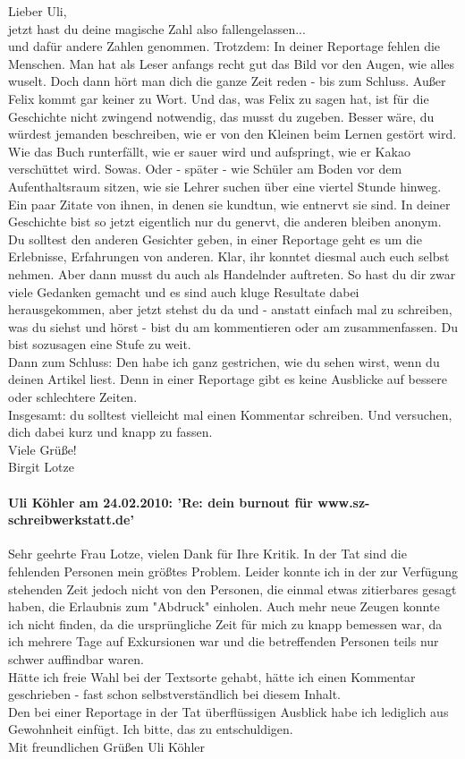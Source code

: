 \documentclass[a4paper,12pt,twoside]{scrbook}
\begin{document}
Lieber Uli,
\\
jetzt hast du deine magische Zahl also fallengelassen...
\\
und dafür andere Zahlen genommen. Trotzdem: In deiner Reportage fehlen die Menschen. Man hat als Leser anfangs recht gut das Bild vor den Augen, wie alles wuselt. Doch dann hört man dich die ganze Zeit reden - bis zum Schluss. Außer Felix kommt gar keiner zu Wort. Und das, was Felix zu sagen hat, ist für die Geschichte nicht zwingend notwendig, das musst du zugeben. Besser wäre, du würdest jemanden beschreiben, wie er von den Kleinen beim Lernen gestört wird. Wie das Buch runterfällt, wie er sauer wird und aufspringt, wie er Kakao verschüttet wird. Sowas. Oder - später - wie Schüler am Boden vor dem Aufenthaltsraum sitzen, wie sie Lehrer suchen über eine viertel Stunde hinweg. Ein paar Zitate von ihnen, in denen sie kundtun, wie entnervt sie sind.
In deiner Geschichte bist so jetzt eigentlich nur du genervt, die anderen bleiben anonym. Du solltest den anderen Gesichter geben, in einer Reportage geht es um die Erlebnisse, Erfahrungen von anderen. Klar, ihr konntet diesmal auch euch selbst nehmen. Aber dann musst du auch als Handelnder auftreten. So hast du dir zwar viele Gedanken gemacht und es sind auch kluge Resultate dabei herausgekommen, aber jetzt stehst du da und - anstatt einfach mal zu schreiben, was du siehst und hörst - bist du am kommentieren oder am zusammenfassen. Du bist sozusagen eine Stufe zu weit.
\\
Dann zum Schluss: Den habe ich ganz gestrichen, wie du sehen wirst, wenn du deinen Artikel liest. Denn in einer Reportage gibt es keine Ausblicke auf bessere oder schlechtere Zeiten.
\\
Insgesamt: du solltest vielleicht mal einen Kommentar schreiben. Und versuchen, dich dabei kurz und knapp zu fassen.
\\
Viele Grüße!
\\
Birgit Lotze
\paragraph{Uli Köhler am 24.02.2010: 'Re: dein burnout für www.sz-schreibwerkstatt.de'}

Sehr geehrte Frau Lotze,
vielen Dank für Ihre Kritik.
In der Tat sind die fehlenden Personen mein größtes Problem. Leider
konnte ich in der zur Verfügung stehenden Zeit jedoch nicht von den
Personen, die einmal etwas zitierbares gesagt haben, die Erlaubnis zum
"Abdruck" einholen. Auch mehr neue Zeugen konnte ich nicht finden, da
die ursprüngliche Zeit für mich zu knapp bemessen war, da ich mehrere
Tage auf Exkursionen war und die betreffenden Personen teils nur schwer
auffindbar waren.
\\
Hätte ich freie Wahl bei der Textsorte gehabt, hätte ich einen Kommentar
geschrieben - fast schon selbstverständlich bei diesem Inhalt.
\\
Den bei einer Reportage in der Tat überflüssigen Ausblick habe ich
lediglich aus Gewohnheit einfügt. Ich bitte, das zu entschuldigen.
\\
Mit freundlichen Grüßen
Uli Köhler
\end{document}
